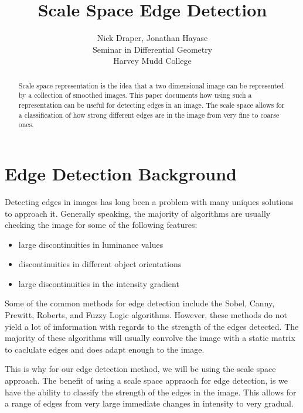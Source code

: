 \documentclass{article}
\title{Scale Space Edge Detection}
\author{
  Nick Draper, Jonathan Hayase\\
  Seminar in Differential Geometry\\
  Harvey Mudd College
}
\begin{document}
\maketitle

\begin{abstract}
  Scale space representation is the idea that a two dimensional image can be represented by a collection of smoothed images.
  This paper documents how using such a representation can be useful for detecting edges in an image.
  The scale space allows for a classification of how strong different edges are in the image from very fine to coarse ones. 
\end{abstract}

\section{Edge Detection Background}
Detecting edges in images has long been a problem with many uniques solutions to approach it.
Generally speaking, the majority of algorithms are usually checking the image for some of the following features:

\begin{itemize}
\item large discontinuities in luminance values
\item discontinuities in different object orientations
\item large discontinuities in the intensity gradient
\end{itemize}
\indent Some of the common methods for edge detection include the Sobel, Canny, Prewitt, Roberts, and Fuzzy Logic algorithms.
However, these methods do not yield a lot of imformation with regards to the strength of the edges detected.
The majority of these algorithms will usually convolve the image with a static matrix to caclulate edges and does adapt enough to the image. 

This is why for our edge detection method, we will be using the scale space approach.
The benefit of using a scale space appraoch for edge detection, is we have the ability to classify the strength of the edges in the image.
This allows for a range of edges from very large immediate changes in intensity to very gradual.
\end{document}
